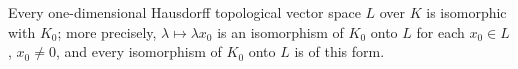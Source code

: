 Every one-dimensional Hausdorff topological vector space $L$ over $K$ is isomorphic with $K_0$; more precisely, $\lambda \mapsto \lambda x_0$ is an isomorphism of $K_0$ onto $L$ for each $x_0 \in L$, $x_0 \neq 0$, and every isomorphism of $K_0$ onto $L$ is of this form.
